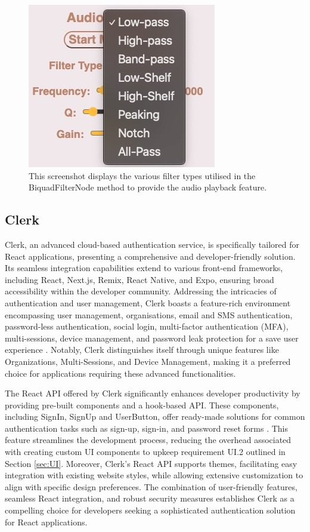 \documentclass{l4proj}
\begin{document}
\begin{figure}
    \centering
    \includegraphics[width=0.4\linewidth]{dissertation/images/filter-type.jpeg}    
    \caption{This screenshot displays the various filter types utilised in the BiquadFilterNode method to provide the audio playback feature.}
    \label{fig:filter-type} 
\end{figure}


\subsection{Clerk}
\label{sec:clerk}

Clerk, an advanced cloud-based authentication service, is specifically tailored for React applications, presenting a comprehensive and developer-friendly solution. Its seamless integration capabilities extend to various front-end frameworks, including React, Next.js, Remix, React Native, and Expo, ensuring broad accessibility within the developer community. Addressing the intricacies of authentication and user management, Clerk boasts a feature-rich environment encompassing user management, organisations, email and SMS authentication, password-less authentication, social login, multi-factor authentication (MFA), multi-sessions, device management, and password leak protection for a save user experience \citep{Grant_2023}. Notably, Clerk distinguishes itself through unique features like Organizations, Multi-Sessions, and Device Management, making it a preferred choice for applications requiring these advanced functionalities.

The React API offered by Clerk significantly enhances developer productivity by providing pre-built components and a hook-based API. These components, including SignIn, SignUp and UserButton, offer ready-made solutions for common authentication tasks such as sign-up, sign-in, and password reset forms \citep{Clerk}. This feature streamlines the development process, reducing the overhead associated with creating custom UI components to upkeep requirement UI.2 outlined in Section \ref{sec:UI}. Moreover, Clerk's React API supports themes, facilitating easy integration with existing website styles, while allowing extensive customization to align with specific design preferences. The combination of user-friendly features, seamless React integration, and robust security measures establishes Clerk as a compelling choice for developers seeking a sophisticated authentication solution for React applications.
\end{document}
